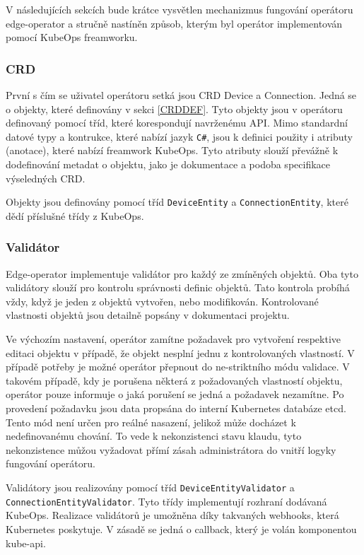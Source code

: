 V následujících sekcích bude krátce vysvětlen mechanizmus fungování operátoru edge-operator a stručně nastíněn způsob, kterým byl operátor implementován pomocí KubeOps freamworku.

\subsubsection*{CRD}
První s čím se uživatel operátoru setká jsou CRD Device a Connection. Jedná se o objekty, které definovány v sekci \ref{CRDDEF}. Tyto objekty jsou v operátoru definovaný pomocí tříd, které korespondují navrženému API. Mimo standardní datové typy a kontrukce, které nabízí jazyk \verb|C#|, jsou k definici použity i atributy (anotace), které nabízí freamwork KubeOps. Tyto atributy slouží převážně k dodefinování metadat o objektu, jako je dokumentace a podoba specifikace výseledných CRD.

Objekty jsou definovány pomocí tříd \verb|DeviceEntity| a \verb|ConnectionEntity|, které dědí příslušné třídy z KubeOps.

\subsubsection*{Validátor}
Edge-operator implementuje validátor pro každý ze zmíněných objektů. Oba tyto validátory slouží pro kontrolu správnosti definic objektů. Tato kontrola probíhá vždy, když je jeden z objektů vytvořen, nebo modifikován. Kontrolované vlastnosti objektů jsou detailně popsány v dokumentaci projektu. 

Ve výchozím nastavení, operátor zamítne požadavek pro vytvoření respektive editaci objektu v případě, že objekt nesplní jednu z kontrolovaných vlastností. V případě potřeby je možné operátor přepnout do ne-striktního módu validace. V takovém případě, kdy je porušena některá z požadovaných vlastností objektu, operátor pouze informuje o jaká porušení se jedná a požadavek nezamítne. Po provedení požadavku jsou data propsána do interní Kubernetes databáze etcd. Tento mód není určen pro reálné nasazení, jelikož může docházet k nedefinovanému chování. To vede k nekonzistenci stavu klaudu, tyto nekonzistence můžou vyžadovat přímí zásah administrátora do vnitří logyky fungování operátoru.

Validátory jsou realizovány pomocí tříd \verb|DeviceEntityValidator| a\\\verb|ConnectionEntityValidator|. Tyto třídy implementují rozhraní dodávaná KubeOps. Realizace validátorů je umožněna díky takvaných webhooks, která Kubernetes poskytuje. V zásadě se jedná o callback, který je volán komponentou kube-api. 

